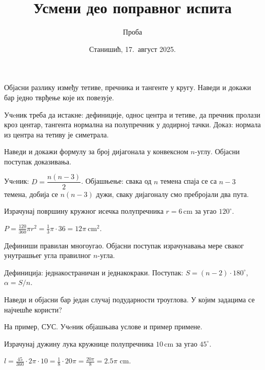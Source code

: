 \documentclass[10pt,a5paper,twoside,addpoints,answers]{exam}
\title{Усмени део поправног испита}
\author{Проба}
\date{Станишић, 17.~август 2025.}
\newcommand{\measure}[2]{#1\,\mathrm{#2}}
\begin{document}
\maketitle

\begin{questions}

\question Објасни разлику између тетиве, пречника и тангенте у кругу. Наведи и докажи бар једно тврђење које их повезује.
\begin{solution}
Учeник треба да истакне: дефиниције, однос центра и тетиве, да пречник пролази кроз центар, тангента нормална на полупречник у додирној тачки. Доказ: нормала из центра на тетиву је симетрала.
\end{solution}

\question[--] Наведи и докажи формулу за број дијагонала у конвексном $n$-углу. Објасни поступак доказивања.
\begin{solution}
Учeник: $D=\dfrac{n(n-3)}2$. Објашњење: свака од $n$ темена спаја се са $n-3$ темена, добија се $n(n-3)$ дужи, сваку дијагоналу смо пребројали два пута.
\end{solution}

\question[--] Израчунај површину кружног исечка полупречника $r=\measure{6}{cm}$ за угао $120^\circ$.
\begin{solution}
$P=\frac{120}{360}\pi r^2=\tfrac13\pi\cdot36=12\pi\ \mathrm{cm}^2$.
\end{solution}

\question[--] Дефиниши правилан многоугао. Објасни поступак израчунавања мере сваког унутрашњег угла правилног $n$-угла.
\begin{solution}
Дефиниција: једнакостраничан и једнакокраки. Поступак: $S=(n-2)\cdot180^\circ$, $\alpha=S/n$.
\end{solution}

\question[--] Наведи и објасни бар један случај подударности троуглова. У којим задацима се најчешће користи?
\begin{solution}
На пример, СУС. Учeник објашњава услове и пример примене.
\end{solution}

\question[--] Израчунај дужину лука кружнице полупречника $\measure{10}{cm}$ за угао $45^\circ$.
\begin{solution}
$l=\frac{45}{360}\cdot 2\pi\cdot 10=\frac18\cdot20\pi=\tfrac{20\pi}8=2.5\pi$ cm.
\end{solution}


\end{questions}
\end{document}
